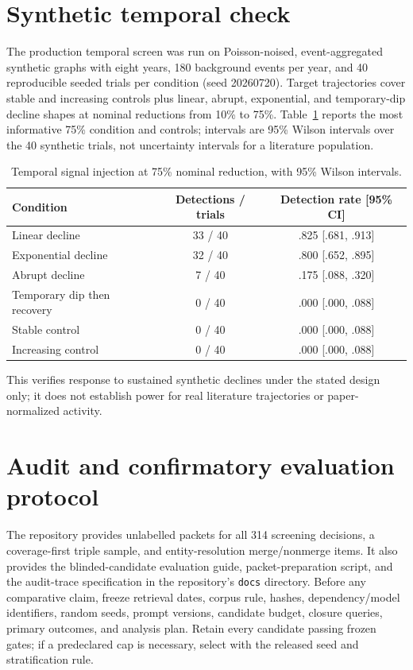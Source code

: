 \documentclass[runningheads]{llncs}
\begin{document}
\section{Synthetic temporal check}
The production temporal screen was run on Poisson-noised, event-aggregated synthetic graphs with eight years, 180 background events per year, and 40 reproducible seeded trials per condition (seed 20260720). Target trajectories cover stable and increasing controls plus linear, abrupt, exponential, and temporary-dip decline shapes at nominal reductions from 10\% to 75\%. Table~\ref{tab:injection} reports the most informative 75\% condition and controls; intervals are 95\% Wilson intervals over the 40 synthetic trials, not uncertainty intervals for a literature population.

\begin{table}[h]
\caption{Temporal signal injection at 75\% nominal reduction, with 95\% Wilson intervals.}
\label{tab:injection}
\centering
\begin{tabular}{lcc}
\toprule
Condition & Detections / trials & Detection rate [95\% CI]\\
\midrule
Linear decline & 33 / 40 & .825 [.681, .913]\\
Exponential decline & 32 / 40 & .800 [.652, .895]\\
Abrupt decline & 7 / 40 & .175 [.088, .320]\\
Temporary dip then recovery & 0 / 40 & .000 [.000, .088]\\
Stable control & 0 / 40 & .000 [.000, .088]\\
Increasing control & 0 / 40 & .000 [.000, .088]\\
\bottomrule
\end{tabular}
\end{table}

This verifies response to sustained synthetic declines under the stated design only; it does not establish power for real literature trajectories or paper-normalized activity.

\section{Audit and confirmatory evaluation protocol}
The repository provides unlabelled packets for all 314 screening decisions, a coverage-first triple sample, and entity-resolution merge/nonmerge items. It also provides the blinded-candidate evaluation guide, packet-preparation script, and the audit-trace specification in the repository's \texttt{docs} directory. Before any comparative claim, freeze retrieval dates, corpus rule, hashes, dependency/model identifiers, random seeds, prompt versions, candidate budget, closure queries, primary outcomes, and analysis plan. Retain every candidate passing frozen gates; if a predeclared cap is necessary, select with the released seed and stratification rule.
\end{document}
